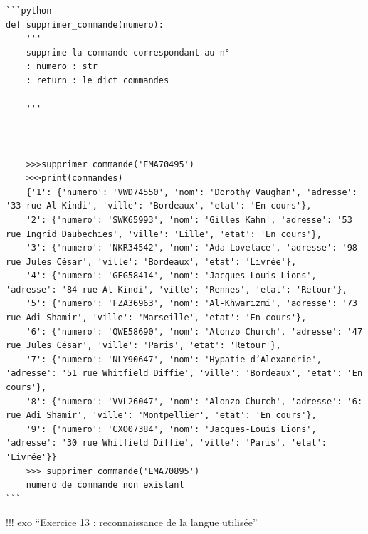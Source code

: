 \documentclass[
]{article}
\begin{document}
\begin{verbatim}
```python
def supprimer_commande(numero):
    '''
    supprime la commande correspondant au n°
    : numero : str
    : return : le dict commandes
    
    '''



    >>>supprimer_commande('EMA70495')  
    >>>print(commandes)
    {'1': {'numero': 'VWD74550', 'nom': 'Dorothy Vaughan', 'adresse': '33 rue Al-Kindi', 'ville': 'Bordeaux', 'etat': 'En cours'},
    '2': {'numero': 'SWK65993', 'nom': 'Gilles Kahn', 'adresse': '53 rue Ingrid Daubechies', 'ville': 'Lille', 'etat': 'En cours'},
    '3': {'numero': 'NKR34542', 'nom': 'Ada Lovelace', 'adresse': '98 rue Jules César', 'ville': 'Bordeaux', 'etat': 'Livrée'},
    '4': {'numero': 'GEG58414', 'nom': 'Jacques-Louis Lions', 'adresse': '84 rue Al-Kindi', 'ville': 'Rennes', 'etat': 'Retour'},
    '5': {'numero': 'FZA36963', 'nom': 'Al-Khwarizmi', 'adresse': '73 rue Adi Shamir', 'ville': 'Marseille', 'etat': 'En cours'},
    '6': {'numero': 'QWE58690', 'nom': 'Alonzo Church', 'adresse': '47 rue Jules César', 'ville': 'Paris', 'etat': 'Retour'},
    '7': {'numero': 'NLY90647', 'nom': 'Hypatie d’Alexandrie', 'adresse': '51 rue Whitfield Diffie', 'ville': 'Bordeaux', 'etat': 'En cours'},
    '8': {'numero': 'VVL26047', 'nom': 'Alonzo Church', 'adresse': '6: rue Adi Shamir', 'ville': 'Montpellier', 'etat': 'En cours'},
    '9': {'numero': 'CXO07384', 'nom': 'Jacques-Louis Lions', 'adresse': '30 rue Whitfield Diffie', 'ville': 'Paris', 'etat': 'Livrée'}}
    >>> supprimer_commande('EMA70895')
    numero de commande non existant
```
\end{verbatim}

!!! exo ``Exercice 13 : reconnaissance de la langue utilisée''
\end{document}
